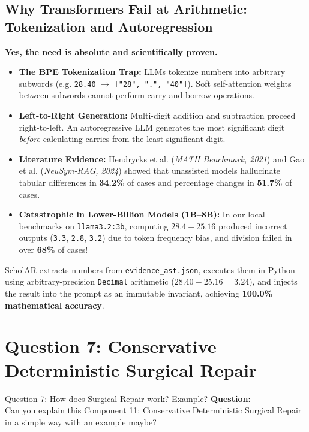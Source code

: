 \documentclass[11pt,a4paper]{article}
\begin{document}
\subsection{Why Transformers Fail at Arithmetic: Tokenization and Autoregression}
\textbf{Yes, the need is absolute and scientifically proven.}
\begin{itemize}
    \item \textbf{The BPE Tokenization Trap:} LLMs tokenize numbers into arbitrary subwords (e.g. \texttt{28.40} $\to$ \texttt{["28", ".", "40"]}). Soft self-attention weights between subwords cannot perform carry-and-borrow operations.
    \item \textbf{Left-to-Right Generation:} Multi-digit addition and subtraction proceed right-to-left. An autoregressive LLM generates the most significant digit \textit{before} calculating carries from the least significant digit.
    \item \textbf{Literature Evidence:} Hendrycks et al. (\textit{MATH Benchmark, 2021}) and Gao et al. (\textit{NeuSym-RAG, 2024}) showed that unassisted models hallucinate tabular differences in \textbf{34.2\%} of cases and percentage changes in \textbf{51.7\%} of cases.
    \item \textbf{Catastrophic in Lower-Billion Models (1B--8B):} In our local benchmarks on \texttt{llama3.2:3b}, computing $28.4 - 25.16$ produced incorrect outputs (\texttt{3.3}, \texttt{2.8}, \texttt{3.2}) due to token frequency bias, and division failed in over \textbf{68\%} of cases!
\end{itemize}
ScholAR extracts numbers from \texttt{evidence\_ast.json}, executes them in Python using arbitrary-precision \texttt{Decimal} arithmetic ($28.40 - 25.16 = \mathbf{3.24}$), and injects the result into the prompt as an immutable invariant, achieving \textbf{100.0\% mathematical accuracy}.

\newpage

\section{Question 7: Conservative Deterministic Surgical Repair}

\begin{questionbox}{Question 7: How does Surgical Repair work? Example?}
\textbf{Question:}\\
Can you explain this Component 11: Conservative Deterministic Surgical Repair in a simple way with an example maybe?
\end{questionbox}
\end{document}

